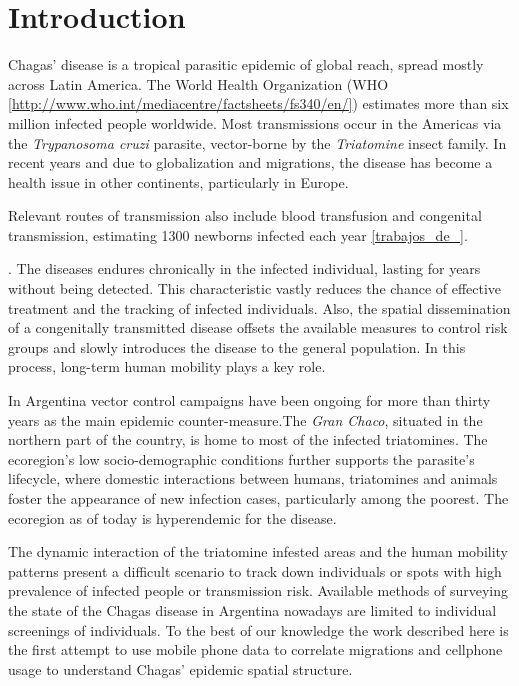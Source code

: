 \section{Introduction}

Chagas' disease is a tropical parasitic epidemic of global reach, spread mostly across Latin America. The World Health Organization (WHO \ref{http://www.who.int/mediacentre/factsheets/fs340/en/}) estimates more than six million infected people worldwide. Most transmissions occur in the Americas via the \textit{Trypanosoma cruzi} parasite, vector-borne by the \textit{Triatomine} insect family. In recent years and due to globalization and migrations, the disease has become a health issue in other continents, particularly in Europe. 

Relevant routes of transmission also include blood transfusion and congenital transmission, estimating 1300 newborns infected each year \ref{trabajos_de_}.\begin{comment}  en el drive estan las ppt del min salud \end{comment}. The diseases endures chronically in the infected individual, lasting for years without being detected. This characteristic vastly reduces the chance of effective treatment and the tracking of infected individuals. Also, the spatial dissemination of a congenitally transmitted disease offsets the available measures to control risk groups and slowly introduces the disease to the general population. In this process, long-term human mobility plays a key role.

In Argentina vector control campaigns have been ongoing for more than thirty years as the main epidemic counter-measure.The \textit{Gran Chaco}, situated in the northern part of the country, is home to most of the infected triatomines. The ecoregion's low socio-demographic conditions further supports the parasite's lifecycle, where domestic interactions between humans, triatomines and animals foster the appearance of new infection cases, particularly among the poorest. The ecoregion as of today is hyperendemic for the disease.

The dynamic interaction of the triatomine infested areas and the human mobility patterns present a difficult scenario to track down individuals or spots with high prevalence of infected people or  transmission risk. Available methods of surveying the state of the Chagas disease in Argentina nowadays are limited to individual screenings of individuals. To the best of our knowledge the work described here is the first attempt to use mobile phone data to correlate migrations and cellphone usage to understand Chagas’ epidemic spatial structure.

